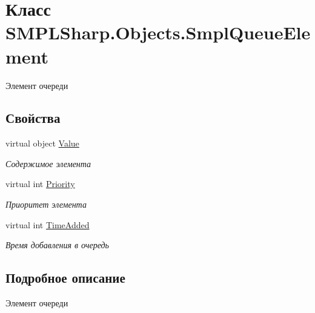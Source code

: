 \hypertarget{class_s_m_p_l_sharp_1_1_objects_1_1_smpl_queue_element}{\section{Класс S\-M\-P\-L\-Sharp.\-Objects.\-Smpl\-Queue\-Element}
\label{d3/d48/class_s_m_p_l_sharp_1_1_objects_1_1_smpl_queue_element}
}


Элемент очереди  


\subsection*{Свойства}
\begin{DoxyCompactItemize}
\item 
virtual object \hyperlink{class_s_m_p_l_sharp_1_1_objects_1_1_smpl_queue_element_aa16777046bf5b47815ff3c8ccab88407}{Value}
\begin{DoxyCompactList}\small\item\em Содержимое элемента \end{DoxyCompactList}\item 
virtual int \hyperlink{class_s_m_p_l_sharp_1_1_objects_1_1_smpl_queue_element_a90590a8e8518db73ed29b3f932f29e5e}{Priority}
\begin{DoxyCompactList}\small\item\em Приоритет элемента \end{DoxyCompactList}\item 
virtual int \hyperlink{class_s_m_p_l_sharp_1_1_objects_1_1_smpl_queue_element_a9bc2b0c2b6dce324521551f4333f9c5c}{Time\-Added}
\begin{DoxyCompactList}\small\item\em Время добавления в очередь \end{DoxyCompactList}\end{DoxyCompactItemize}


\subsection{Подробное описание}
Элемент очереди 



